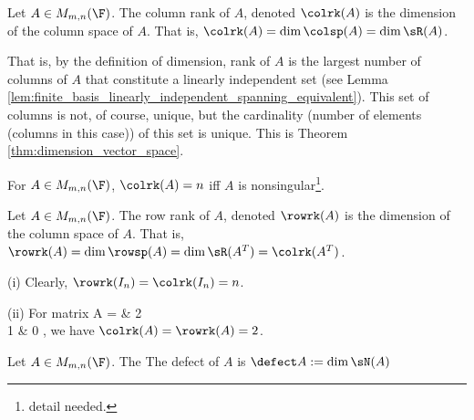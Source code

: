 \begin{definition}\label{def:column_rank_matrix}
Let $A\in M_{m,n}(\F)$. The column rank of $A$, denoted $\colrk(A)$ is the dimension of the column space of $A$. That is, $\colrk(A) = \dim\colsp(A)=\dim\sR(A)$.
\end{definition}%

\begin{remark}
That is, by the definition of dimension, rank of $A$ is the largest number of columns of $A$ that constitute a linearly independent set (see Lemma \ref{lem:finite_basis_linearly_independent_spanning_equivalent}). This set of columns is not, of course, unique, but the cardinality (number of elements (columns in this case)) of this set is unique. This is Theorem \ref{thm:dimension_vector_space}.

For $A\in M_{m,n}(\F)$, $\colrk(A) = n$ iff $A$ is nonsingular\footnote{detail needed.}.
\end{remark}


\begin{definition}\label{def:row_rank_matrix}
Let $A\in M_{m,n}(\F)$. The row rank of $A$, denoted $\rowrk(A)$ is the dimension of the column space of $A$. That is, $\rowrk(A) = \dim \rowsp(A) =\dim \sR(A^T) = \colrk(A^T)$.
\end{definition}

\begin{example}
\ben
\item [(i)] Clearly, $\rowrk(I_n) = \colrk(I_n) = n$.
\item [(ii)] For matrix
\be
A =  & 2 \\ 1 & 0 \eepm,
\ee
we have $\colrk(A) = \rowrk(A) = 2$.
\een
\end{example}

\begin{definition}\label{def:defect_matrix}
Let $A\in M_{m,n}(\F)$. The The defect of $A$ is $\defect A := \dim \sN(A)$
\end{definition}



